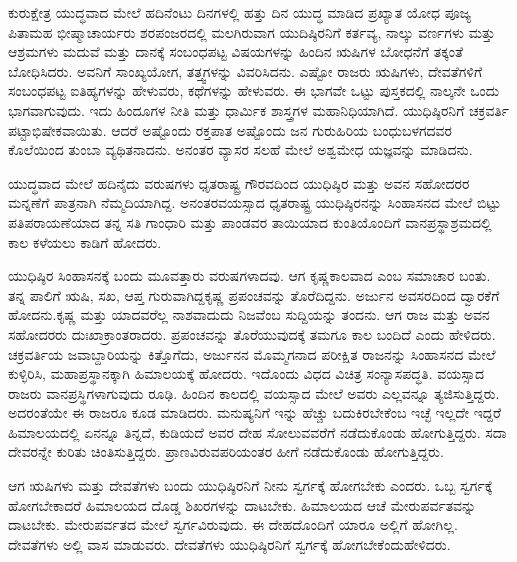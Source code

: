 \vskip 0.2cm

ಕುರುಕ್ಷೇತ್ರ ಯುದ್ಧವಾದ ಮೇಲೆ ಹದಿನೆಂಟು ದಿನಗಳಲ್ಲಿ ಹತ್ತು ದಿನ ಯುದ್ಧ ಮಾಡಿದ ಪ್ರಖ್ಯಾತ ಯೋಧ ಪೂಜ್ಯ ಪಿತಾಮಹ ಭೀಷ್ಮಾಚಾರ್ಯರು ಶರಪಂಜರದಲ್ಲಿ ಮಲಗಿರುವಾಗ ಯುದಿಷ್ಠಿರನಿಗೆ ಕರ್ತವ್ಯ, ನಾಲ್ಕು ವರ್ಣಗಳು ಮತ್ತು ಆಶ್ರಮಗಳು ಮದುವೆ ಮತ್ತು ದಾನಕ್ಕೆ ಸಂಬಂಧಪಟ್ಟ ವಿಷಯಗಳನ್ನು ಹಿಂದಿನ ಋಷಿಗಳ ಬೋಧನೆಗೆ ತಕ್ಕಂತೆ ಬೋಧಿಸಿದರು. ಅವನಿಗೆ ಸಾಂಖ್ಯಯೋಗ, ತತ್ತ್ವಗಳನ್ನು ವಿವರಿಸಿದನು. ಎಷ್ಟೋ ರಾಜರು ಋಷಿಗಳು, ದೇವತೆಗಳಿಗೆ ಸಂಬಂಧಪಟ್ಟ ಐತಿಹ್ಯಗಳನ್ನು ಹೇಳುವರು, ಕಥೆಗಳನ್ನು ಹೇಳುವರು. ಈ ಭಾಗವೇ ಒಟ್ಟು ಪುಸ್ತಕದಲ್ಲಿ ನಾಲ್ಕನೇ ಒಂದು ಭಾಗವಾಗುವುದು. ಇದು ಹಿಂದೂಗಳ ನೀತಿ ಮತ್ತು ಧಾರ್ಮಿಕ ಶಾಸ್ತ್ರಗಳ ಮಹಾನಿಧಿಯಾಗಿದೆ. ಯುಧಿಷ್ಠಿರನಿಗೆ ಚಕ್ರವರ್ತಿ ಪಟ್ಟಾಭಿಷೇಕವಾಯಿತು. ಆದರೆ ಅಷ್ಟೊಂದು ರಕ್ತಪಾತ ಅಷ್ಟೊಂದು ಜನ ಗುರುಹಿರಿಯ ಬಂಧುಬಳಗದವರ ಕೊಲೆಯಿಂದ ತುಂಬಾ ವ್ಯಥಿತನಾದನು. ಅನಂತರ ವ್ಯಾಸರ ಸಲಹೆ ಮೇಲೆ ಅಶ್ವಮೇಧ ಯಜ್ಞವನ್ನು ಮಾಡಿದನು.

\vskip 0.1cm

ಯುದ್ಧವಾದ ಮೇಲೆ ಹದಿನೈದು ವರುಷಗಳು ಧೃತರಾಷ್ಟ್ರ ಗೌರವದಿಂದ ಯುಧಿಷ್ಠಿರ ಮತ್ತು ಅವನ ಸಹೋದರರ ಮನ್ನಣೆಗೆ ಪಾತ್ರನಾಗಿ ನೆಮ್ಮದಿಯಾಗಿದ್ದ. ಅನಂತರ\break ವಯಸ್ಸಾದ ಧೃತರಾಷ್ಟ್ರ ಯುಧಿಷ್ಠಿರನನ್ನು ಸಿಂಹಾಸನದ ಮೇಲೆ ಬಿಟ್ಟು ಪತಿಪರಾಯಣೆಯಾದ ತನ್ನ ಸತಿ ಗಾಂಧಾರಿ ಮತ್ತು ಪಾಂಡವರ ತಾಯಿಯಾದ ಕುಂತಿಯೊಂದಿಗೆ ವಾನಪ್ರಸ್ಥಾಶ್ರಮದಲ್ಲಿ ಕಾಲ ಕಳೆಯಲು ಕಾಡಿಗೆ ಹೋದರು.

\vskip 0.1cm

ಯುಧಿಷ್ಠಿರ ಸಿಂಹಾಸನಕ್ಕೆ ಬಂದು ಮೂವತ್ತಾರು ವರುಷಗಳಾದವು. ಆಗ ಕೃಷ್ಣ\break ಕಾಲವಾದ ಎಂಬ ಸಮಾಚಾರ ಬಂತು. ತನ್ನ ಪಾಲಿಗೆ ಋಷಿ, ಸಖ, ಆಪ್ತ ಗುರುವಾಗಿದ್ದ\break ಕೃಷ್ಣ ಪ್ರಪಂಚವನ್ನು ತೊರೆದಿದ್ದನು. ಅರ್ಜುನ ಅವಸರದಿಂದ ದ್ವಾರಕೆಗೆ ಹೋದನು.\break ಕೃಷ್ಣ ಮತ್ತು ಯಾದವರೆಲ್ಲ ನಾಶವಾದುದು ನಿಜವೆಂಬ ಸುದ್ದಿಯನ್ನು ತಂದನು. ಆಗ ರಾಜ ಮತ್ತು ಅವನ ಸಹೋದರರು ದುಃಖಾಕ್ರಾಂತರಾದರು. ಪ್ರಪಂಚವನ್ನು ತೊರೆಯುವುದಕ್ಕೆ ತಮಗೂ ಕಾಲ ಬಂದಿದೆ ಎಂದು ಹೇಳಿದರು. ಚಕ್ರವರ್ತಿಯ ಜವಾಬ್ದಾರಿಯನ್ನು ಕಿತ್ತೊಗೆದು, ಅರ್ಜುನನ ಮೊಮ್ಮಗನಾದ ಪರೀಕ್ಷಿತ ರಾಜನನ್ನು ಸಿಂಹಾಸನದ ಮೇಲೆ ಕುಳ್ಳಿರಿಸಿ, ಮಹಾಪ್ರಸ್ಥಾನಕ್ಕಾಗಿ ಹಿಮಾಲಯಕ್ಕೆ ಹೋದರು. ಇದೊಂದು ವಿಧದ ವಿಚಿತ್ರ ಸಂನ್ಯಾಸಪದ್ಧತಿ. ವಯಸ್ಸಾದ ರಾಜರು ವಾನಪ್ರಸ್ಥಿಗಳಾಗುವುದು ರೂಢಿ. ಹಿಂದಿನ ಕಾಲದಲ್ಲಿ ವಯಸ್ಸಾದ ಮೇಲೆ ಅವರು ಎಲ್ಲವನ್ನೂ ತ್ಯಜಿಸುತ್ತಿದ್ದರು. ಅದರಂತೆಯೇ ಈ ರಾಜರೂ ಕೂಡ ಮಾಡಿದರು. ಮನುಷ್ಯನಿಗೆ ಇನ್ನು ಹೆಚ್ಚು ಬದುಕಿರಬೇಕೆಂಬ ಇಚ್ಛೆ ಇಲ್ಲದೇ ಇದ್ದರೆ ಹಿಮಾಲಯದಲ್ಲಿ ಏನನ್ನೂ ತಿನ್ನದೆ, ಕುಡಿಯದೆ ಅವರ ದೇಹ ಸೋಲುವವರೆಗೆ ನಡೆದುಕೊಂಡು ಹೋಗುತ್ತಿದ್ದರು. ಸದಾ ದೇವರನ್ನೇ ಕುರಿತು ಚಿಂತಿಸುತ್ತಿದ್ದರು. ಪ್ರಾಣವಿರುವ\break ಪರಿಯಂತರ ಹೀಗೆ ನಡೆದುಕೊಂಡು ಹೋಗುತ್ತಿದ್ದರು.

\vskip 0.1cm

ಆಗ ಋಷಿಗಳು ಮತ್ತು ದೇವತೆಗಳು ಬಂದು ಯುಧಿಷ್ಠಿರನಿಗೆ ನೀನು ಸ್ವರ್ಗಕ್ಕೆ ಹೋಗಬೇಕು ಎಂದರು. ಒಬ್ಬ ಸ್ವರ್ಗಕ್ಕೆ ಹೋಗಬೇಕಾದರೆ ಹಿಮಾಲಯದ ದೊಡ್ಡ ಶಿಖರಗಳನ್ನು ದಾಟಬೇಕು. ಹಿಮಾಲಯದ ಆಚೆ ಮೇರುಪರ್ವತವನ್ನು ದಾಟಬೇಕು. ಮೇರುಪರ್ವತದ ಮೇಲೆ ಸ್ವರ್ಗವಿರುವುದು. ಈ ದೇಹದೊಂದಿಗೆ ಯಾರೂ ಅಲ್ಲಿಗೆ ಹೋಗಿಲ್ಲ. ದೇವತೆಗಳು ಅಲ್ಲಿ ವಾಸ ಮಾಡುವರು. ದೇವತೆಗಳು ಯುಧಿಷ್ಠಿರನಿಗೆ ಸ್ವರ್ಗಕ್ಕೆ ಹೋಗಬೇಕೆಂದು\break ಹೇಳಿದರು.

\vskip 0.1cm

